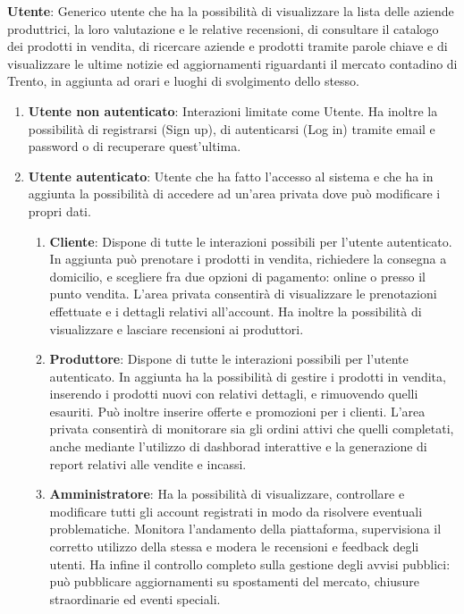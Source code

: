 \begin{attori}
     \item \textbf{Utente}: Generico utente che ha la possibilità di visualizzare la lista delle aziende produttrici, la loro valutazione e le relative recensioni, di consultare il catalogo dei prodotti in vendita, di ricercare aziende e prodotti tramite parole chiave e di visualizzare le ultime notizie ed aggiornamenti riguardanti il mercato contadino di Trento, in aggiunta ad orari e luoghi di svolgimento dello stesso.
     \begin{enumerate}
         \item \textbf{Utente non autenticato}: Interazioni limitate come Utente. Ha inoltre la possibilità di registrarsi (Sign up), di autenticarsi (Log in) tramite email e password o di recuperare quest'ultima.
         
         \item \textbf{Utente autenticato}: Utente che ha fatto l'accesso al sistema e che ha in aggiunta la possibilità di accedere ad un'area privata dove può modificare i propri dati.
     
         \begin{enumerate}
             \item \textbf{Cliente}: Dispone di tutte le interazioni possibili per l'utente autenticato. In aggiunta può prenotare i prodotti in vendita, richiedere la consegna a domicilio, e scegliere fra due opzioni di pagamento: online o presso il punto vendita. L'area privata consentirà di visualizzare le prenotazioni effettuate e i dettagli relativi all'account. Ha inoltre la possibilità di visualizzare e lasciare recensioni ai produttori. 
             
             \item \textbf{Produttore}: Dispone di tutte le interazioni possibili per l'utente autenticato. In aggiunta ha la possibilità di gestire i prodotti in vendita, inserendo i prodotti nuovi con relativi dettagli, e rimuovendo quelli esauriti. Può inoltre inserire offerte e promozioni per i clienti. L'area privata consentirà di monitorare sia gli ordini attivi che quelli completati, anche mediante l'utilizzo di dashborad interattive e la generazione di report relativi alle vendite e incassi.
             
              \item \textbf{Amministratore}: Ha la possibilità di visualizzare, controllare e modificare tutti gli account registrati in modo da risolvere eventuali problematiche. Monitora l’andamento della piattaforma, supervisiona il corretto utilizzo della stessa e modera le recensioni e feedback degli utenti.
              Ha infine il controllo completo sulla gestione degli avvisi pubblici: può pubblicare aggiornamenti su spostamenti del mercato, chiusure straordinarie ed eventi speciali.
 

\end{enumerate}
\end{enumerate}
\end{attori}

